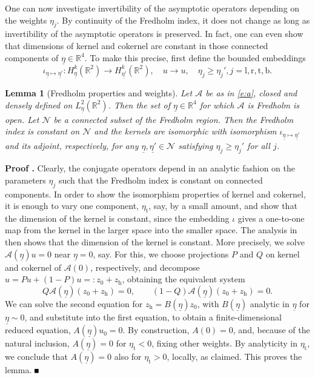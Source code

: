 \documentclass[10pt]{article}
\newtheorem{Lemma}{Lemma}[section]
\newenvironment{Proof}[1][\unskip]%
 {\begin{trivlist} \item[]{\bf Proof #1. }}%
 {\hspace*{\fill}$\rule{.4\baselineskip}{.4\baselineskip}$\end{trivlist}}
\newcommand{\R}{\mathbb{R}}
\renewcommand{\geq}{\geqslant}
\begin{document}
One can now investigate invertibility of the asymptotic operators depending on the weights $\eta_j$. By continuity of the Fredholm index, it does not change as long as invertibility of the asymptotic operators is preserved. In fact, one can even show that dimensions of kernel and cokernel are constant in those connected components of $\underline{\eta}\in\R^4$. To make this precise, first define the bounded embeddings
\[
\iota_{\underline{\eta}\mapsto\underline{\eta'}}:H^k_{\underline{\eta}}(\R^2)\to H^k_{\underline{\eta'}}(\R^2), \quad u\to u,\quad \eta_j\geq\eta_j',j=\mathrm{l,r,t,b}.
\]

\begin{Lemma}[Fredholm properties and weights]\label{Fredholm_persistency_lemma} Let $\mathcal{A}$ be as in \eqref{e:a}, closed and densely defined on $L^2_{\underline{\eta}}(\R^2)$. Then the set of $\underline{\eta}\in \R^4$ for which $\mathcal{A}$ is Fredholm is open. Let $\mathcal{N}$ be a connected subset of the Fredholm region. Then the Fredholm index is constant on $\mathcal{N}$ and the kernels are isomorphic with isomorphism $\iota_{\underline{\eta}\mapsto\underline{\eta'}}$ and its adjoint, respectively, for any $\underline{\eta},\underline{\eta'}\in \mathcal{N}$ satisfying $\eta_j\geq\eta_j'$ for all $j$. 
\end{Lemma}
\begin{Proof}
Clearly, the conjugate operators depend in an analytic fashion on the parameters $\eta_j$ such that the Fredholm index is constant on connected components. In order to show the isomorphism properties of kernel and cokernel, it is enough to vary one component, $\eta_\mathrm{t}$, say, by a small amount, and show that the dimension of the kernel is constant, since the embedding $\iota$ gives a one-to-one map from the kernel in the larger space into the smaller space. The analysis in \cite[\S7.1.3]{kato2013perturbation} then shows that the dimension of the kernel is constant. More precisely, we solve $\mathcal{A}(\underline{\eta})u=0$ near $\underline{\eta}=0$, say. For this, we choose projections $P$ and $Q$ on kernel and cokernel of $\mathcal{A}(0)$, respectively, and decompose $u=Pu+(1-P)u=:z_0+z_\mathrm{h}$, obtaining the equivalent system 
\[
Q\mathcal{A}(\underline{\eta})(z_0+z_\mathrm{h})=0,\qquad (1-Q)\mathcal{A}(\underline{\eta})(z_0+z_\mathrm{h})=0.
\]
We can solve the second equation for $z_\mathrm{h}=B(\underline{\eta})z_0$, with $B(\underline{\eta})$ analytic in $\underline{\eta}$ for $\underline{\eta}\sim 0$, and substitute into the first equation, to obtain a finite-dimensional reduced equation, $A(\underline{\eta})u_0=0$. By construction,  $A(0)= 0$, and, because of the natural inclusion, $A(\underline{\eta})=0$ for $\eta_\mathrm{t}<0$, fixing other weights. By analyticity in $\eta_\mathrm{t}$, we conclude that $A(\underline{\eta})=0$ also for $\eta_\mathrm{t}>0$, locally, as claimed. This proves the lemma. 
\end{Proof}
\end{document}
